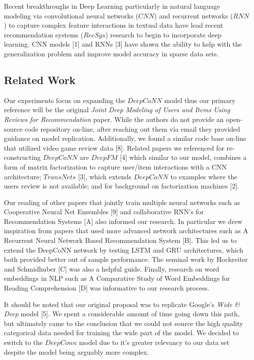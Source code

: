 \documentclass[10pt,twocolumn,letterpaper]{article}
\begin{document}
\par Recent breakthroughs in Deep Learning particularly in natural language modeling via convolutional neural networks ($CNN$) and recurrent networks ($RNN$) to capture complex feature interactions in textual data have lead recent recommendation systems ($RecSys$) research to begin to incorporate deep learning. CNN models [1] and RNNs [3] have shown the ability to help with the generalization problem and improve model accuracy in sparse data sets.

\subsection{Related Work}
Our experiments focus on expanding the $DeepCoNN$ model thus our primary reference will be the original \textit{Joint Deep Modeling of Users and Items Using Reviews for Recommendation} paper. While the authors do not provide an open-source code repository on-line, after reaching out them via email they provided guidance on model replication. Additionally, we found a similar code base on-line that utilized video game review data [8]. Related papers we referenced for re-constructing $DeepCoNN$ are $DeepFM$ [4] which similar to our model, combines a form of matrix factorization to capture user/item interactions with a CNN architecture; $TransNets$ [3], which extends $DeepCoNN$ to examples where the users review is not available; and for background on factorization machines [2]. 

Our reading of other papers that jointly train multiple neural networks such as Cooperative Neural Net Ensembles [9] and collaborative RNN's for Recommendation Systems [A] also informed our research. In particular we drew inspiration from papers that used more advanced network architectures such as  A Recurrent Neural Network Based Recommendation System [B]. This led us to extend the DeepCoNN network by testing LSTM and GRU architectures, which both provided better out of sample performance. The seminal work by Hochreiter and Schmidhuber [C] was also a helpful guide. Finally, research on word embeddings in NLP such as A Comparative Study of Word Embeddings for Reading Comprehension [D] was informative to our research process. 

It should be noted that our original proposal was to replicate Google's \textit{Wide \& Deep} model [5]. We spent a considerable amount of time going down this path, but ultimately came to the conclusion that we could not source the high quality categorical data needed for training the wide part of the model. We decided to switch to the $DeepConn$ model due to it's greater relevancy to our data set despite the model being arguably more complex. 
\end{document}
